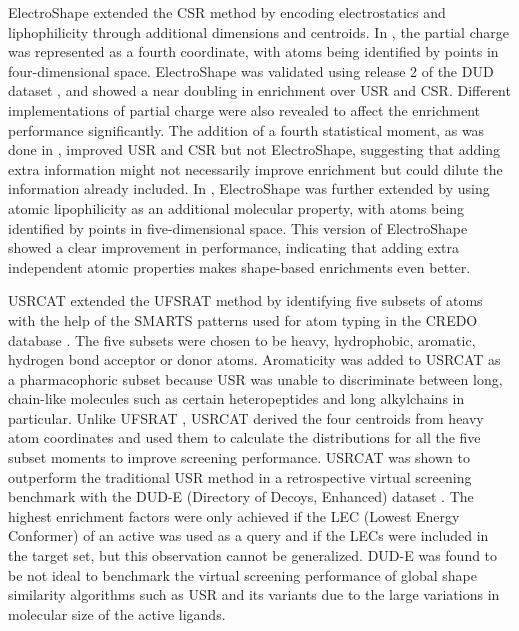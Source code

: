 ElectroShape \citep{1337,1338} extended the CSR \citep{1334} method by encoding electrostatics and liphophilicity through additional dimensions and centroids. In \citep{1337}, the partial charge was represented as a fourth coordinate, with atoms being identified by points in four-dimensional space. ElectroShape was validated using release 2 of the DUD dataset \citep{87}, and showed a near doubling in enrichment over USR and CSR. Different implementations of partial charge were also revealed to affect the enrichment performance significantly. The addition of a fourth statistical moment, as was done in \citep{1333}, improved USR and CSR but not ElectroShape, suggesting that adding extra information might not necessarily improve enrichment but could dilute the information already included. In \citep{1338}, ElectroShape was further extended by using atomic lipophilicity as an additional molecular property, with atoms being identified by points in five-dimensional space. This version of ElectroShape showed a clear improvement in performance, indicating that adding extra independent atomic properties makes shape-based enrichments even better.

USRCAT \citep{1331} extended the UFSRAT \citep{1436} method by identifying five subsets of atoms with the help of the SMARTS patterns used for atom typing in the CREDO database \citep{522}. The five subsets were chosen to be heavy, hydrophobic, aromatic, hydrogen bond acceptor or donor atoms. Aromaticity was added to USRCAT as a pharmacophoric subset because USR was unable to discriminate between long, chain-like molecules such as certain heteropeptides and long alkylchains in particular. Unlike UFSRAT \citep{1436}, USRCAT \citep{1331} derived the four centroids from heavy atom coordinates and used them to calculate the distributions for all the five subset moments to improve screening performance. USRCAT was shown to outperform the traditional USR method in a retrospective virtual screening benchmark with the DUD-E (Directory of Decoys, Enhanced) dataset \citep{1185}. The highest enrichment factors were only achieved if the LEC (Lowest Energy Conformer) of an active was used as a query and if the LECs were included in the target set, but this observation cannot be generalized. DUD-E was found to be not ideal to benchmark the virtual screening performance of global shape similarity algorithms such as USR and its variants due to the large variations in molecular size of the active ligands.

